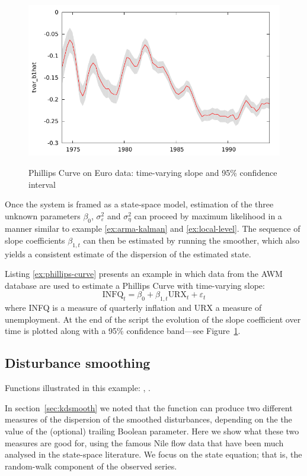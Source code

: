 \begin{figure}[htbp]
  \centering
    \includegraphics{figures/timevar_PhCurve} \\[10pt]
  \caption{Phillips Curve on Euro data: time-varying slope and
    95\% confidence interval}
  \label{fig:tvar}
\end{figure}

Once the system is framed as a state-space model, estimation of the
three unknown parameters $\beta_0$, $\sigma^2_{\varepsilon}$ and
$\sigma^2_{\eta}$ can proceed by maximum likelihood in a manner
similar to example \ref{ex:arma-kalman} and \ref{ex:local-level}. The
sequence of slope coefficients $\beta_{1,t}$ can then be estimated by
running the smoother, which also yields a consistent estimate of the
dispersion of the estimated state.

Listing \ref{ex:phillips-curve} presents an example in which data from
the AWM database are used to estimate a Phillips Curve with
time-varying slope:
\[
\mbox{INFQ}_t = \beta_0 + \beta_{1,t} \mbox{URX}_t + \varepsilon_t
\]
where INFQ is a measure of quarterly inflation and URX a measure of
unemployment.  At the end of the script the evolution of the slope
coefficient over time is plotted along with a 95\% confidence
band---see Figure~\ref{fig:tvar}.


\subsection{Disturbance smoothing}
\label{sec:example_dsmooth}

Functions illustrated in this example: , .

In section~\ref{sec:kdsmooth} we noted that the 
function can produce two different measures of the dispersion of the
smoothed disturbances, depending on the the value of the (optional)
trailing Boolean parameter. Here we show what these two measures are
good for, using the famous Nile flow data that have been much analysed
in the state-space literature. We focus on the state equation; that
is, the random-walk component of the observed series.

